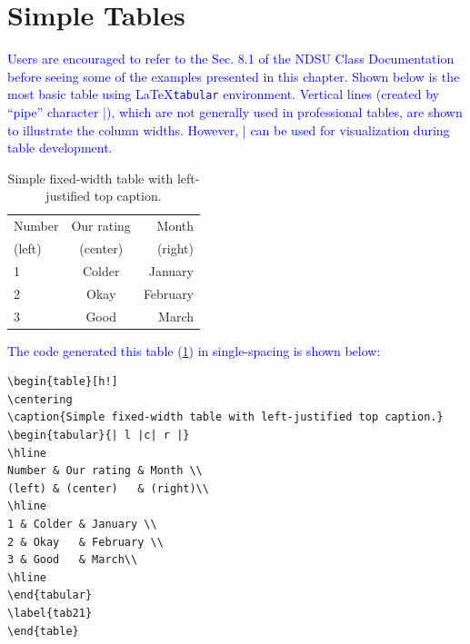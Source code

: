 \documentclass[phd]{ndsu-thesis-2022}
\newcommand\italk[1]{\textcolor{blue}{#1}}  %
\newcommand\lx{\LaTeX\xspace}
\begin{document}

\section{Simple Tables}

\italk{Users are encouraged to refer to the Sec. 8.1 of the NDSU Class Documentation before seeing some of the examples presented in this chapter. Shown below is the most basic table using \lx \texttt{tabular} environment. Vertical lines (created by ``pipe'' character |), which are not generally used in professional tables, are shown to illustrate the column widths. However, | can be used for visualization during table development.}

\begin{table}[ht!]
\centering
\caption{Simple fixed-width table with left-justified top caption.}
\begin{tabular}{| l |c| r |}
\hline
Number & Our rating & Month \\
(left) & (center)   & (right)\\
\hline
1 & Colder & January \\
2 & Okay   & February \\
3 & Good   & March\\
\hline
\end{tabular}
\label{tab21}
\end{table}

\italk{The code generated this table (\cref{tab21}) in single-spacing is shown below:}

{\singlespacing
\begin{verbatim}
\begin{table}[h!]
\centering
\caption{Simple fixed-width table with left-justified top caption.}
\begin{tabular}{| l |c| r |}
\hline
Number & Our rating & Month \\
(left) & (center)   & (right)\\
\hline
1 & Colder & January \\
2 & Okay   & February \\
3 & Good   & March\\
\hline
\end{tabular}
\label{tab21}
\end{table}
\end{verbatim}
}
\end{document}

